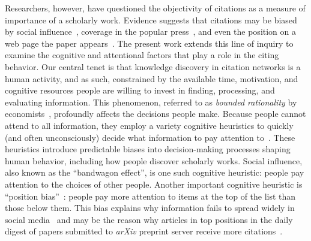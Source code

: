 \documentclass[10pt]{bmc_article}
\newenvironment{bmcformat}{\baselineskip20pt\sloppy\setboolean{publ}{false}}{\baselineskip20pt\sloppy}
\begin{document}
\begin{bmcformat}
Researchers, however, have questioned the objectivity of citations as a measure of importance of a scholarly work. Evidence suggests that citations may be biased by social influence~\cite{Schweitzer14}, coverage in the popular press~\cite{Phillips91}, and even the position on a web page the paper appears~\cite{arxiv-visibility}.
%
The present work extends this line of inquiry to examine the cognitive and attentional factors that play a role in the citing behavior.
Our central tenet is that knowledge discovery in citation networks is a human activity, and as such, constrained by the available time, motivation, and cognitive resources people are willing to invest in finding, processing, and evaluating information. This phenomenon, referred to as \emph{bounded rationality} by economists~\cite{Kahneman03,simon1982models}, profoundly affects the decisions people make. Because people cannot attend to all information, they employ a variety cognitive heuristics to quickly (and often unconsciously) decide what information to pay attention to~\cite{Kahneman11}. These heuristics introduce predictable biases into decision-making processes shaping human behavior, including how people discover scholarly works. Social influence, also known as the ``bandwagon effect'', is one such cognitive heuristic: people pay attention to the choices of other people.
Another important cognitive heuristic is ``position bias''~\cite{Payne51}: people pay more attention to items at the top of the list than those below them. This bias explains why information fails to spread widely in social media~\cite{Lerman2016futureinternet} and may be the reason why articles in top positions in the daily digest of papers submitted to \emph{arXiv} preprint server receive more citations~\cite{Dietrich08,arxiv-visibility}.




\end{bmcformat}
\end{document}
